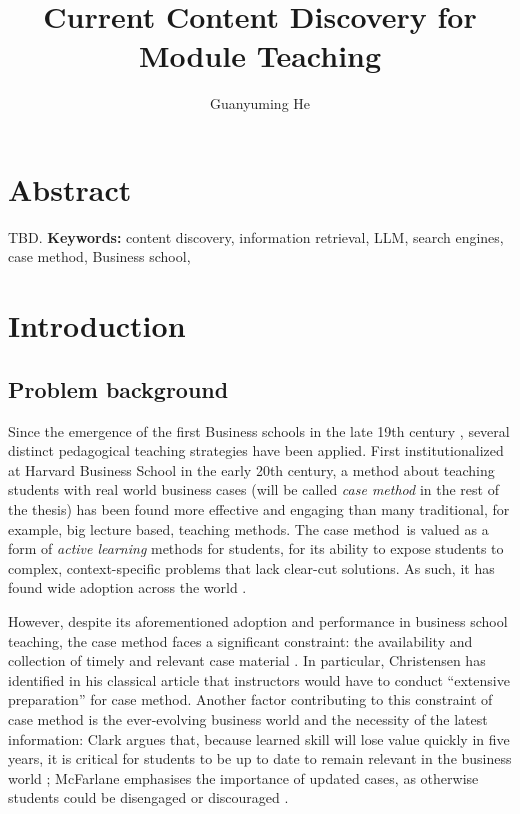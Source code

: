 \documentclass[final-report]{report-template}
\title{Current Content Discovery for Module Teaching}
\author{Guanyuming He}
\newcommand\casemethod{case method}
\begin{document}
\maketitlepage  

\section*{Abstract}
TBD.
\textbf{Keywords:} content discovery, information retrieval, LLM, search engines, \casemethod, Business school,

\section{Introduction}
\subsection{Problem background}
Since the emergence of the first Business schools in the late 19th century
\cite{first.bis.school.1, first.bis.school.2}, several distinct pedagogical
teaching strategies have been applied.  First institutionalized at Harvard
Business School \cite{case.method.origin.1, case.method.origin.2} in the early
20th century, a method about teaching students with real world business cases
(will be called \emph{\casemethod} in the rest of the thesis) has been found
more effective and engaging \cite{case.method.support.1, case.method.support.2,
case.method.support.3} than many traditional, for example, big lecture based,
teaching methods. The \casemethod\ is valued as a form of \emph{active
learning} methods for students, for its ability to expose students to complex,
context-specific problems that lack clear-cut solutions. As such, it has found
wide adoption across the world \cite{case.method.adoption.1,
case.method.adoption.2}.

However, despite its aforementioned adoption and performance in business school
teaching, the case method faces a significant constraint: the availability and
collection of timely and relevant case material \cite{case.method.limit.1,
case.method.limit.3}. In particular, Christensen has identified in his classical
article that instructors would have to conduct ``extensive preparation''
\cite{case.method.limit.2} for case method. Another factor contributing to this
constraint of case method is the ever-evolving business world and the necessity
of the latest information: Clark argues that, because learned skill will lose
value quickly in five years, it is critical for students to be up to date to
remain relevant in the business world \cite{case.method.limit.4}; McFarlane
emphasises the importance of updated cases, as otherwise students could be
disengaged or discouraged \cite{case.method.limit.5}.
\end{document}
